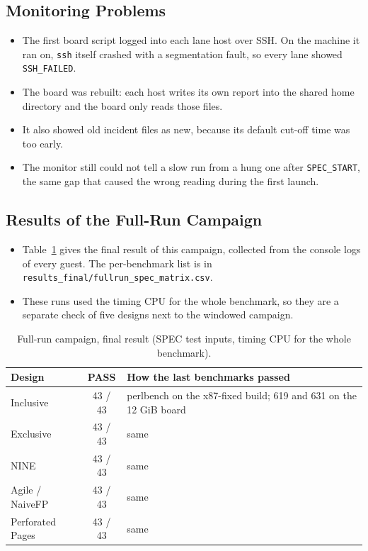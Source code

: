 \subsection{Monitoring Problems}
\begin{itemize}
    \item The first board script logged into each lane host over SSH. On the machine it ran on, \texttt{ssh} itself crashed with a segmentation fault, so every lane showed \texttt{SSH\_FAILED}.
    \item The board was rebuilt: each host writes its own report into the shared home directory and the board only reads those files.
    \item It also showed old incident files as new, because its default cut-off time was too early.
    \item The monitor still could not tell a slow run from a hung one after \texttt{SPEC\_START}, the same gap that caused the wrong reading during the first launch.
\end{itemize}

\subsection{Results of the Full-Run Campaign}
\begin{itemize}
    \item Table~\ref{tab:chr_fullrun} gives the final result of this campaign, collected from the console logs of every guest. The per-benchmark list is in \texttt{results\_final/fullrun\_spec\_matrix.csv}.
    \item These runs used the timing CPU for the whole benchmark, so they are a separate check of five designs next to the windowed campaign.
\end{itemize}

\begin{table}[htbp]
\centering
\small
\caption{Full-run campaign, final result (SPEC test inputs, timing CPU for the whole benchmark).}
\label{tab:chr_fullrun}
\begin{tabularx}{\textwidth}{l c X}
\toprule
\textbf{Design} & \textbf{PASS} & \textbf{How the last benchmarks passed} \\
\midrule
Inclusive & 43 / 43 & perlbench on the x87-fixed build; 619 and 631 on the 12 GiB board \\
Exclusive & 43 / 43 & same \\
NINE & 43 / 43 & same \\
Agile / NaiveFP & 43 / 43 & same \\
Perforated Pages & 43 / 43 & same \\
\bottomrule
\end{tabularx}
\end{table}

